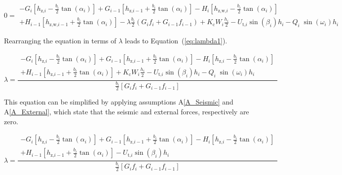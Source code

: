 \documentclass[12pt]{article}
\newcommand{\aref}[1]{A\ref{#1}}
\begin{document}
\begin{equation}\label{eq:Moment}
  0 = \begin{array}{l} - {G}_{i} \left[ {h_{\text{z,}i}} -
      \frac{b_{i}}{2} { \tan\left(\alpha_{i}\right)}
      \right] + {G}_{i-1} \left[ {h_{\text{z,}i-1}} +
      \frac{b_{i}}{2} { \tan\left(\alpha_{i}\right)}
      \right] - H_{i}\left[ h_{\text{z,w,}i} -
      \frac{b_{i}}{2} { \tan\left(\alpha_{i}\right)}
      \right] \\[5pt] + H_{i-1}\left[ h_{\text{z,w,}i-1} +
      \frac{b_{i}}{2} { \tan\left(\alpha_{i}\right)}
      \right] -\lambda \frac{b_{i}}{2} \left( G_{i}
    f_{i} + G_{i-1} f_{i-1} \right) +
    K_{\text{c}} W_{i} \frac{h_{i}}{2} - U_{\text{t,}i}
    \sin\left(\beta_{i}\right) h_{i} -
    Q_{i}\;{\sin\left(\omega_{i}\right)}
    h_{i} \end{array}
\end{equation} 

\noindent
Rearranging the equation in terms of $\lambda$ leads to 
Equation~(\ref{eq:lambda1}).

\begin{equation}\label{eq:lambda1}
  \lambda = \frac { \begin{array}{l} - {G}_{i} \left[
        {h_{\text{z,}i}} - \frac{b_{i}}{2} {
          \tan\left(\alpha_{i}\right)} \right] +
      {G}_{i-1} \left[ {h_{\text{z,}i-1}} +
        \frac{b_{i}}{2} { \tan\left(\alpha_{i}\right)}
        \right] - H_{i}\left[ h_{\text{z,}i} -
        \frac{b_{i}}{2} { \tan\left(\alpha_{i}\right)}
        \right] \\[5pt] + H_{i-1}\left[ h_{\text{z,}i-1} +
        \frac{b_{i}}{2} { \tan\left(\alpha_{i}\right)}
        \right] + K_{\text{c}} W_{i} \frac{h_{i}}{2} -
      U_{\text{t,}i} \sin\left(\beta_{i}\right) h_{i} -
      Q_{i}\;{\sin\left(\omega_{i}\right)}
      h_{i} \end{array} } { \frac{b_{i}}{2} \left[
      G_{i} f_{i} + G_{i-1} f_{i-1}
      \right] }
\end{equation}

\noindent This equation can be simplified by applying assumptions 
\aref{A_Seismic} and \aref{A_External}, which state that the seismic and 
external forces, respectively are zero.

\begin{equation*}
\lambda = \frac { \begin{array}{l} - {G}_{i} \left[
	{h_{\text{z,}i}} - \frac{b_{i}}{2} {
		\tan\left(\alpha_{i}\right)} \right] +
	{G}_{i-1} \left[ {h_{\text{z,}i-1}} +
	\frac{b_{i}}{2} { \tan\left(\alpha_{i}\right)}
	\right] - H_{i}\left[ h_{\text{z,}i} -
	\frac{b_{i}}{2} { \tan\left(\alpha_{i}\right)}
	\right] \\[5pt] + H_{i-1}\left[ h_{\text{z,}i-1} +
	\frac{b_{i}}{2} { \tan\left(\alpha_{i}\right)}
	\right] -
	U_{\text{t,}i} \sin\left(\beta_{i}\right) h_{i} \end{array} } 
	{ \frac{b_{i}}{2} \left[
	G_{i} f_{i} + G_{i-1} f_{i-1}
	\right] }
\end{equation*}
\end{document}
